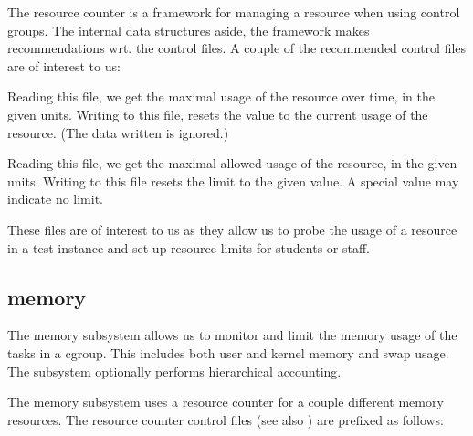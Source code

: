 \label{section:cgroups:resource-counter}

The resource counter is a framework for managing a resource when using control
groups\cite{resource-counter.txt}.  The internal data structures aside, the
framework makes recommendations wrt. the control files. A couple of the
recommended control files are of interest to us:

\begin{description}[\setleftmargin{0.2in}\breaklabel\setlabelstyle{\tt}]

\item[<resource>.max\_usage\_in\_<unit\_of\_measurement>] Reading this file, we
get the maximal usage of the resource over time, in the given units. Writing to
this file, resets the value to the current usage of the resource. (The data
written is ignored.)

\item[<resource>.limit\_in\_<unit\_of\_measurement>] Reading this file, we get
the maximal allowed usage of the resource, in the given units. Writing to this
file resets the limit to the given value. A special value may indicate no
limit.

\end{description}

These files are of interest to us as they allow us to probe the usage of a
resource in a test instance and set up resource limits for students or staff.

\subsection{memory}

The memory subsystem allows us to monitor and limit the memory usage of the
tasks in a cgroup\cite{memory.txt}. This includes both user and kernel memory
and swap usage.  The subsystem optionally performs hierarchical accounting.

The memory subsystem uses a resource counter for a couple different memory
resources. The resource counter control files (see also
) are prefixed as follows:

